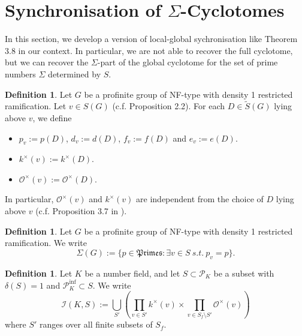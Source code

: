 \documentclass{article}
\theoremstyle{plain}
\theoremstyle{definition}
\newtheorem{defn}[thm]{Definition}
\theoremstyle{remark}
\begin{document}
\section{Synchronisation of $\Sigma$-Cyclotomes}
In this section, we develop a version of local-global sychronisation like Theorem 3.8 in our context. In particular, we are not able to recover the full cyclotome, but we can recover the $\Sigma$-part of the global cyclotome for the set of prime numbers $\Sigma$ determined by $S$. \par 
\begin{defn}
Let $G$ be a profinite group of NF-type with density 1 restricted ramification. Let $v \in S(G)$ (c.f. Proposition 2.2). For each $D \in \widetilde{S}(G)$ lying above $v$, we define
\begin{itemize}
    \item $p_v:= p(D)$, $d_v:= d(D)$, $f_v := f(D)$ and $e_v := e(D)$.
    \item $k^{\times}(v) := k^{\times}(D)$.
    \item $\mathcal{O}^{\times}(v) := \mathcal{O}^{\times}(D)$.
\end{itemize}
In particular, $\mathcal{O}^{\times}(v)$ and $k^{\times}(v)$ are independent from the choice of $D$ lying above $v$ (c.f. Proposition 3.7 in \cite{Ho1}). 
\end{defn}
\begin{defn}
Let $G$ be a profinite group of NF-type with density 1 restricted ramification. We write
$$
\Sigma(G) := \{p \in \mathfrak{Primes}: \exists v \in S~s.t.~p_v=p\}.
$$
\end{defn}
\begin{defn}
Let $K$ be a number field, and let $S \subset \mathscr{P}_K$ be a subset with $\delta(S) = 1$ and $\mathscr{P}_K^{\text{inf}} \subset S$. We write
$$
\mathcal{I}(K,S) := \bigcup_{S'}(\prod_{v \in S'} k^{\times}(v) \times \prod_{v \in S_f\setminus S'} \mathcal{O}^{\times}(v))
$$
where $S'$ ranges over all finite subsets of $S_f$.
\end{defn}
\end{document}
